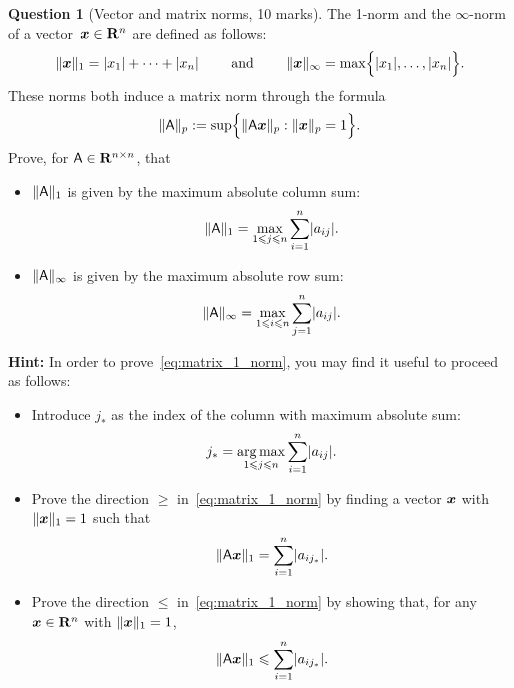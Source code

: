 \documentclass[11pt]{article}
\theoremstyle{definition}
\newtheorem{question}{Question}
\begin{document}
\newpage
\begin{question}
    [Vector and matrix norms, 10 marks]
    The 1-norm and the $\infty$-norm of a vector~$\mathbf{\boldsymbol{x}} \in \mathbf R^n$ are defined as follows:
    \[
        \lVert\mathbf{\boldsymbol{x}}\rVert_1 = \lvert x_1 \rvert + \dotsb + \lvert x_n \rvert
        \qquad \text{ and } \qquad
        \lVert\mathbf{\boldsymbol{x}}\rVert_{\infty} = \max \Bigl\{ \lvert x_1 \rvert, \dotsc, \lvert x_n \rvert \Bigr\}.
    \]
    These norms both induce a matrix norm through the formula
    \[
        \lVert\mathsf A\rVert_p
        := \sup \Bigl\{ \lVert\mathsf A \mathbf{\boldsymbol{x}}\rVert_p : \lVert\mathbf{\boldsymbol{x}}\rVert_p = 1 \Bigr\}.
    \]
    Prove, for $\mathsf A \in \mathbf R^{n \times n}$, that
    \begin{itemize}
        \item
            $\lVert\mathsf A\rVert_1$ is given by the maximum absolute column sum:
            \begin{equation}
                \label{eq:matrix_1_norm}
               \lVert\mathsf A\rVert_1 = \max_{1 \leqslant j \leqslant n}  \sum_{i=1}^{n} \lvert a_{ij}\rvert.
            \end{equation}

        \item
            $\lVert\mathsf A\rVert_{\infty}$ is given by the maximum absolute row sum:
            \[
                \lVert\mathsf A\rVert_{\infty} = \max_{1 \leqslant i \leqslant n}  \sum_{j=1}^{n} \lvert a_{ij}\rvert.
            \]
    \end{itemize}

    \textbf{Hint:} In order to prove~\eqref{eq:matrix_1_norm},
    you may find it useful to proceed as follows:
    \begin{itemize}
        \item
            Introduce $j_*$ as the index of the column with maximum absolute sum:
            \[
                j_* = \operatorname*{arg\,max}_{1 \leqslant j \leqslant n}  \sum_{i=1}^{n} \lvert a_{ij}\rvert.
            \]
        \item
            Prove the direction $\geq$ in~\eqref{eq:matrix_1_norm} by finding a vector $\mathbf{\boldsymbol{x}}$ with $\lVert\mathbf{\boldsymbol{x}}\rVert_1 = 1$ such that
            \[
                \lVert\mathsf A \mathbf{\boldsymbol{x}}\rVert_1 =  \sum_{i=1}^{n} \lvert a_{ij_*}\rvert.
            \]

        \item
            Prove the direction $\leq$ in~\eqref{eq:matrix_1_norm} by showing that,
            for any $\mathbf{\boldsymbol{x}} \in \mathbf R^n$ with $\lVert\mathbf{\boldsymbol{x}}\rVert_1 = 1$,
            \[
               \lVert\mathsf A \mathbf{\boldsymbol{x}}\rVert_1 \leqslant  \sum_{i=1}^{n} \lvert a_{ij_*}\rvert.
           \]
    \end{itemize}
\end{question}
\end{document}

